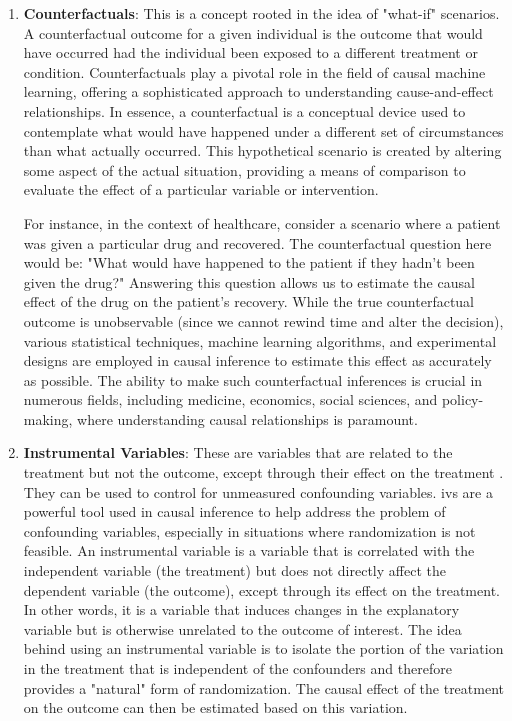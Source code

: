 \begin{enumerate}
    \item \textbf{Counterfactuals}: This is a concept rooted in the idea of "what-if" scenarios. A counterfactual outcome for a given individual is the outcome that would have occurred had the individual been exposed to a different treatment or condition.
    Counterfactuals play a pivotal role in the field of causal machine learning, offering a sophisticated approach to understanding cause-and-effect relationships. In essence, a counterfactual is a conceptual device used to contemplate what would have happened under a different set of circumstances than what actually occurred. This hypothetical scenario is created by altering some aspect of the actual situation, providing a means of comparison to evaluate the effect of a particular variable or intervention.

    For instance, in the context of healthcare, consider a scenario where a patient was given a particular drug and recovered. The counterfactual question here would be: "What would have happened to the patient if they hadn't been given the drug?" Answering this question allows us to estimate the causal effect of the drug on the patient's recovery. While the true counterfactual outcome is unobservable (since we cannot rewind time and alter the decision), various statistical techniques, machine learning algorithms, and experimental designs are employed in causal inference to estimate this effect as accurately as possible. The ability to make such counterfactual inferences is crucial in numerous fields, including medicine, economics, social sciences, and policy-making, where understanding causal relationships is paramount.
    
    \item \textbf{Instrumental Variables}: These are variables that are related to the treatment but not the outcome, except through their effect on the treatment \cite{burgessImprovingBiasCoverage2012,daviesIssuesReportingConduct2013}. They can be used to control for unmeasured confounding variables. \Acp{iv} are a powerful tool used in causal inference to help address the problem of confounding variables, especially in situations where randomization is not feasible. An instrumental variable is a variable that is correlated with the independent variable (the treatment) but does not directly affect the dependent variable (the outcome), except through its effect on the treatment. In other words, it is a variable that induces changes in the explanatory variable but is otherwise unrelated to the outcome of interest. The idea behind using an instrumental variable is to isolate the portion of the variation in the treatment that is independent of the confounders and therefore provides a "natural" form of randomization. The causal effect of the treatment on the outcome can then be estimated based on this variation.
    

\end{enumerate}
